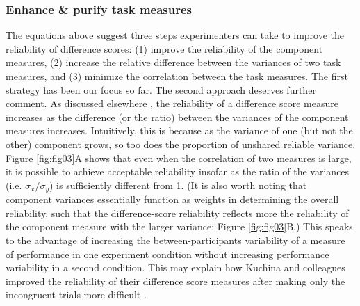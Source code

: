 \documentclass[a4paper,12pt]{article}
\begin{document}
\subsubsection{Enhance \& purify task measures}

The equations above suggest three steps experimenters can take to improve the reliability of difference scores: (1) improve the reliability of the component measures, (2) increase the relative difference between the variances of two task measures, and (3) minimize the correlation between the task measures. The first strategy has been our focus so far. The second approach deserves further comment. As discussed elsewhere \cite{chiou1996reliability}, the reliability of a difference score measure increases as the difference (or the ratio) between the variances of the component measures increases. Intuitively, this is because as the variance of one (but not the other) component grows, so too does the proportion of unshared reliable variance. Figure \ref{fig:fig03}A shows that even when the correlation of two measures is large, it is possible to achieve acceptable reliability insofar as the ratio of the variances (i.e. $\sigma_x / \sigma_y$) is sufficiently different from 1. (It is also worth noting that component variances essentially function as weights in determining the overall reliability, such that the difference-score reliability reflects more the reliability of the component measure with the larger variance; Figure \ref{fig:fig03}B.) This speaks to the advantage of increasing the between-participants variability of a measure of performance in one experiment condition without increasing performance variability in a second condition. This may explain how Kuchina and colleagues improved the reliability of their difference score measures after making only the incongruent trials more difficult \cite{kucina2022solution}.
\end{document}
